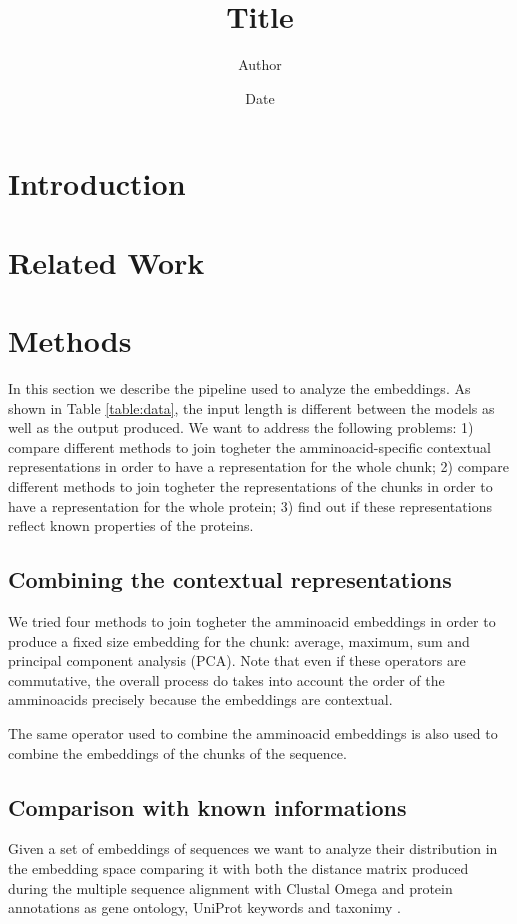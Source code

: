 \documentclass[12pt, letterpaper, twocolumn]{article}
\title{Title}
\author{Author}
\date{Date}
\begin{document}
\maketitle

\section{Introduction}

\section{Related Work}

\section{Methods}

In this section we describe the pipeline used to analyze the embeddings. As shown in Table \ref{table:data}, the input length is different between the models as well as the output produced. We want to address the following problems: 1) compare different methods to join togheter the amminoacid-specific contextual representations in order to have a representation for the whole chunk; 2) compare different methods to join togheter the representations of the chunks in order to have a representation for the whole protein; 3) find out if these representations reflect known properties of the proteins.

\subsection{Combining the contextual representations}
We tried four methods to join togheter the amminoacid embeddings in order to produce a fixed size embedding for the chunk: average, maximum, sum and principal component analysis (PCA). Note that even if these operators are commutative, the overall process do takes into account the order of the amminoacids precisely because the embeddings are contextual.

The same operator used to combine the amminoacid embeddings is also used to combine the embeddings of the chunks of the sequence.

\subsection{Comparison with known informations}
Given a set of embeddings of sequences we want to analyze their distribution in the embedding space comparing it with both the distance matrix produced during the multiple sequence alignment with Clustal Omega \cite{sievers2011fast} and protein annotations as gene ontology, UniProt keywords and taxonimy \cite{uniprot23}.
\end{document}
